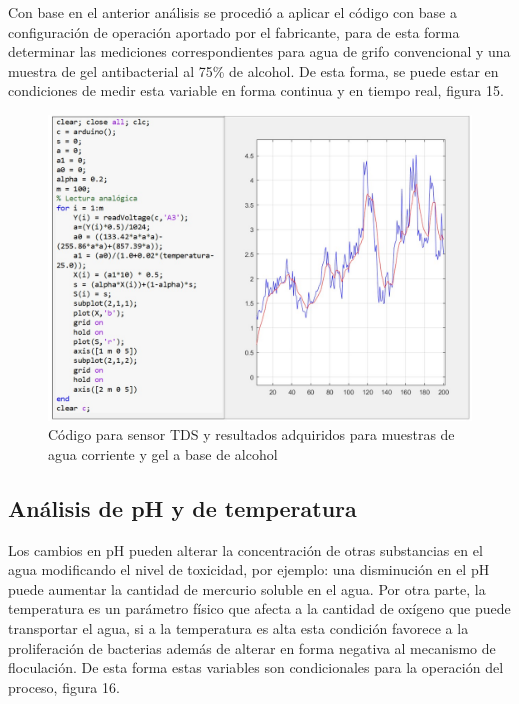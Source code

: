 \documentclass[conference]{IEEEtran}
\begin{document}
Con base en el anterior análisis se procedió a aplicar el código con base a configuración de operación aportado por el fabricante, para de esta forma determinar las mediciones correspondientes para agua de grifo convencional y una muestra de gel antibacterial al 75\% de alcohol. De esta forma, se puede estar en condiciones de medir esta variable en forma continua y en tiempo real, figura 15.

\begin{figure}[htbp]
	\centering
	\includegraphics[width=0.8\columnwidth]{fig15.jpg}
	\caption{Código para sensor TDS y resultados adquiridos para muestras de agua corriente y gel a base de alcohol}
	\label{fig:codigo-tds}
\end{figure}

\subsection{Análisis de pH y de temperatura}

Los cambios en pH pueden alterar la concentración de otras substancias en el agua modificando el nivel de toxicidad, por ejemplo: una disminución en el pH puede aumentar la cantidad de mercurio soluble en el agua. Por otra parte, la temperatura es un parámetro físico que afecta a la cantidad de oxígeno que puede transportar el agua, si a la temperatura es alta esta condición favorece a la proliferación de bacterias además de alterar en forma negativa al mecanismo de floculación. De esta forma estas variables son condicionales para la operación del proceso, figura 16.
\end{document}
